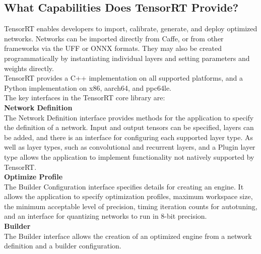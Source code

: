     \subsection{What Capabilities Does TensorRT Provide?}
    TensorRT enables developers to import, calibrate, generate, and deploy optimized networks. Networks can be imported directly from Caffe, or from other frameworks via the UFF or ONNX formats. They may also be created programmatically by 
    instantiating individual layers and setting parameters and weights directly. \\ 
    \vspace{3mm}
    TensorRT provides a C++ implementation on all supported platforms, and a Python implementation on x86, aarch64, and ppc64le. \\ 
    \vspace{3mm}
    The key interfaces in the TensorRT core library are: \\ 
    \vspace{3mm}
     \textbf{Network Definition} \\ 
    \vspace{3mm}
    The Network Definition interface provides methods for the application to specify the definition of a network. Input and output tensors can be specified, layers can be added, and there is an interface for configuring each supported layer type. 
    As well as layer types, such as convolutional and recurrent layers, and a Plugin layer type allows the application to implement functionality not natively supported by TensorRT. \\ 
    \vspace{3mm}
     \textbf{Optimize Profile} \\ 
    \vspace{3mm}
    The Builder Configuration interface specifies details for creating an engine. It allows the application to specify optimization profiles, maximum workspace size, the minimum acceptable level of precision, timing iteration counts for autotuning, 
    and an interface for quantizing networks to run in 8-bit precision. \\ 
    \vspace{3mm}
     \textbf{Builder} \\ 
    \vspace{3mm}
    The Builder interface allows the creation of an optimized engine from a network definition and a builder configuration. \\ 
    \vspace{3mm}
